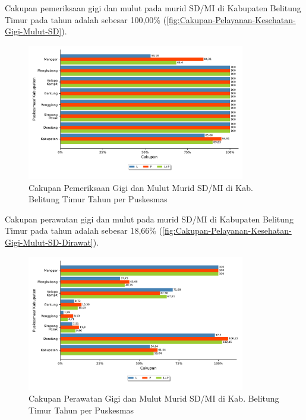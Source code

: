 Cakupan pemeriksaan gigi dan mulut pada murid SD/MI di Kabupaten Belitung Timur pada tahun \tP adalah sebesar 100,00\% (\autoref{fig:Cakupan-Pelayanan-Kesehatan-Gigi-Mulut-SD}).

\begin{figure}[H]
	\centering
	\includegraphics[width=0.85\textwidth]{bab_05/bab_05_27c_gimulSDdiperiksa}
	\caption{Cakupan Pemeriksaan Gigi dan Mulut Murid SD/MI di Kab. Belitung Timur Tahun \tP per Puskesmas}
	\label{fig:Cakupan-Pelayanan-Kesehatan-Gigi-Mulut-SD}
\end{figure}

Cakupan perawatan gigi dan mulut pada murid SD/MI di Kabupaten Belitung Timur pada tahun \tP adalah sebesar 18,66\% (\autoref{fig:Cakupan-Pelayanan-Kesehatan-Gigi-Mulut-SD-Dirawat}).

\begin{figure}[H]
	\centering
	\includegraphics[width=0.85\textwidth]{bab_05/bab_05_27d_gimulSDdirawat}
	\caption{Cakupan Perawatan Gigi dan Mulut Murid SD/MI di Kab. Belitung Timur Tahun \tP per Puskesmas}
	\label{fig:Cakupan-Pelayanan-Kesehatan-Gigi-Mulut-SD-Dirawat}
\end{figure}

